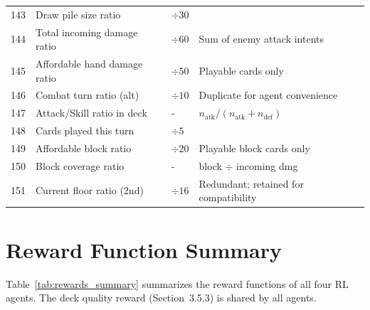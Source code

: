 {\begin{longtable}{p{1.8cm}p{4.5cm}p{2.5cm}p{3.5cm}}
    143   & Draw pile size ratio      & $\div 30$               & \\
    144   & Total incoming damage ratio & $\div 60$             & Sum of enemy attack intents \\
    145   & Affordable hand damage ratio & $\div 50$            & Playable cards only \\
    146   & Combat turn ratio (alt)   & $\div 10$               & Duplicate for agent convenience \\
    147   & Attack/Skill ratio in deck & -                    & $n_{\text{atk}} / (n_{\text{atk}} + n_{\text{def}})$ \\
    148   & Cards played this turn    & $\div 5$                & \\
    149   & Affordable block ratio    & $\div 20$               & Playable block cards only \\
    150   & Block coverage ratio      & -                    & block $\div$ incoming dmg \\
    151   & Current floor ratio (2nd) & $\div 16$               & Redundant; retained for compatibility \\
\end{longtable}}

\section*{Reward Function Summary}
\label{app:rewards}

Table~\ref{tab:rewards_summary} summarizes the reward functions of all four RL agents. The deck quality reward (Section~3.5.3) is shared by all agents.

